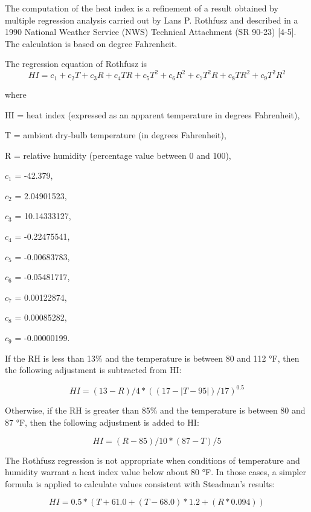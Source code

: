 The computation of the heat index is a refinement of a result obtained by multiple regression analysis carried out by Lans P. Rothfusz and described in a 1990 National Weather Service (NWS) Technical Attachment (SR 90-23) [4-5]. The calculation is based on degree Fahrenheit.

The regression equation of Rothfusz is
\begin{equation}  \label{eq:rm-1}
HI = c_1 + c_2T + c_3R + c_4TR + c_5T^2 + c_6R^2 + c_7T^2R + c_8TR^2 + c_9T^2R^2
\end{equation}

where

HI = heat index (expressed as an apparent temperature in degrees Fahrenheit),

T = ambient dry-bulb temperature (in degrees Fahrenheit),

R = relative humidity (percentage value between 0 and 100),

$c_1$ = -42.379,

$c_2$ = 2.04901523,

$c_3$ = 10.14333127,

$c_4$ = -0.22475541,

$c_5$ = -0.00683783,

$c_6$ = -0.05481717,

$c_7$ = 0.00122874,

$c_8$ = 0.00085282,

$c_9$ = -0.00000199.

If the RH is less than 13\% and the temperature is between 80 and 112 °F, then the following adjustment is subtracted from HI:

\begin{equation}  \label{eq:rm-2}
HI = (13 - R) / 4 * ((17 - |T - 95|) / 17)^{0.5}
\end{equation}

Otherwise, if the RH is greater than 85\% and the temperature is between 80 and 87 °F, then the following adjustment is added to HI:

\begin{equation}  \label{eq:rm-3}
HI = (R - 85) / 10 * (87 - T) / 5
\end{equation}

The Rothfusz regression is not appropriate when conditions of temperature and humidity warrant a heat index value below about 80 °F. In those cases, a simpler formula is applied to calculate values consistent with Steadman's results:

\begin{equation}  \label{eq:rm-4}
HI = 0.5 * (T + 61.0 + (T - 68.0) * 1.2 + (R * 0.094))
\end{equation}

